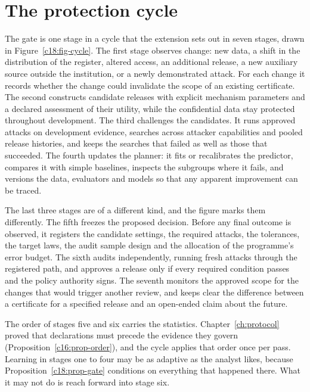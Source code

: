 \section{The protection cycle}\label{c18:sec-cycle}

The gate is one stage in a cycle that the extension sets out in seven stages, drawn in
Figure~\ref{c18:fig-cycle}. The first stage observes change: new data, a shift in the distribution of the register, altered access, an additional release, a new auxiliary source outside the institution,
or a newly demonstrated attack. For each change it records whether the change could invalidate the scope of an existing certificate. The second constructs candidate releases with
explicit mechanism parameters and a declared assessment of their utility, while the confidential data stay protected throughout development. The third challenges the candidates.
It runs approved attacks on development evidence, searches across attacker capabilities and
pooled release histories, and keeps the searches that failed as well as those that succeeded.
The fourth updates the planner: it fits or recalibrates the predictor, compares it with simple baselines, inspects the subgroups where it fails, and versions the data, evaluators and
models so that any apparent improvement can be traced.

The last three stages are of a different kind, and the figure marks them differently. The
fifth freezes the proposed decision. Before any final outcome is observed, it registers the candidate settings, the required attacks, the tolerances, the target laws, the audit sample design
and the allocation of the programme's error budget. The sixth audits independently, running fresh attacks through the registered path, and approves a release only if every required
condition passes and the policy authority signs. The seventh monitors the approved scope
for the changes that would trigger another review, and keeps clear the difference between a
certificate for a specified release and an open-ended claim about the future.

The order of stages five and six carries the statistics. Chapter~\ref{ch:protocol} proved that declarations
must precede the evidence they govern (Proposition~\ref{c16:prop-order}), and the cycle applies that order
once per pass. Learning in stages one to four may be as adaptive as the analyst likes, because
Proposition~\ref{c18:prop-gate} conditions on everything that happened there. What it may not do is reach
forward into stage six.

